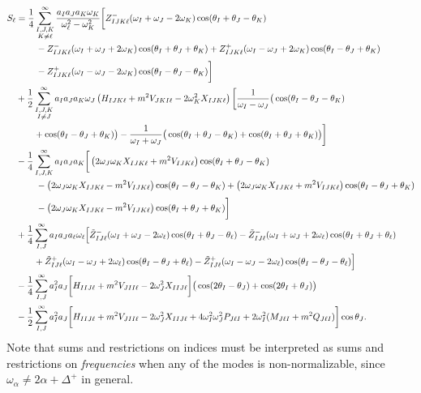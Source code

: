\documentclass[../PhD.tex]{subfiles}
\newcommand{\thl}{\theta_\ell}
\begin{document}
\begin{align}
\label{general source}
S_\ell &=\frac{1}{4} \sum_{\substack{I,J,K \\ K \neq \ell}}^\infty \frac{a_I a_J a_K \omega_K}{\ol^2 - \omega_K^2} \bigg[ Z^-_{IJK\ell} (\omega_I + \omega_J - 2\omega_K) \cos (\theta_I + \theta_J - \theta_K) \nonumber \\
%
&\qquad \frac{}{} - Z^-_{IJK\ell} (\omega_I + \omega_J + 2\omega_K) \cos (\theta_I + \theta_J + \theta_K) + Z^+_{IJK\ell} (\omega_I - \omega_J + 2\omega_K)  \cos(\theta_I - \theta_J + \theta_K) \nonumber \\
%
& \qquad \frac{}{} - Z^+_{IJK\ell} (\omega_I - \omega_J - 2\omega_K) \cos (\theta_I - \theta_J - \theta_K) \bigg] \nonumber \\
%
& + \frac{1}{2}\sum_{\substack{I,J,K \\ I \neq J}}^\infty a_I a_J a_K \omega_J \left( H_{IJK\ell} + m^2 V_{JKI\ell} - 2\omega_K^2 X_{IJK\ell} \right) \bigg[ \frac{1}{\omega_I - \omega_J} \big( \cos (\theta_I - \theta_J - \theta_K)  \nonumber \\
%
& \qquad + \cos(\theta_I - \theta_J + \theta_K) \big) - \frac{1}{\omega_I + \omega_J} \big( \cos (\theta_I + \theta_J - \theta_K)  + \cos ( \theta_I + \theta_J + \theta_K) \big) \bigg] \nonumber \\
%
& - \frac{1}{4} \sum_{I,J,K}^\infty a_I a_J a_K \bigg[ \left( 2\omega_J \omega_K X_{IJK\ell} + m^2 V_{IJK\ell} \right)\cos(\theta_I + \theta_J - \theta_K) \nonumber \\
%
& \qquad \frac{}{} -  \left( 2\omega_J\omega_K X_{IJK\ell} - m^2 V_{IJK\ell} \right) \cos(\theta_I - \theta_J - \theta_K) + \left(2\omega_J \omega_K X_{IJK\ell} + m^2 V_{IJK\ell} \right) \cos (\theta_I - \theta_J + \theta_K) \nonumber \\
%
& \qquad \frac{}{} - \left( 2\omega_J\omega_K X_{IJK\ell} - m^2 V_{IJK\ell} \right) \cos(\theta_I + \theta_J + \theta_K) \bigg] \nonumber \\
%
& + \frac{1}{4} \sum_{I,J}^\infty a_I a_J a_\ell \ol \Big[ \tilde Z^-_{IJ\ell} (\omega_I + \omega_J - 2\ol) \cos (\theta_I + \theta_J - \thl) - \tilde Z^-_{IJ\ell} (\omega_I + \omega_J + 2\ol) \cos(\theta_I + \theta_J +  \thl) \nonumber \\
%
& \qquad + \tilde Z^+_{IJ\ell} (\omega_I - \omega_J + 2\ol) \cos(\theta_I - \theta_J + \thl)  - \tilde Z^+_{IJ\ell} (\omega_I - \omega_J - 2\ol) \cos( \theta_I - \theta_J - \thl)  \Big] \nonumber \\
%
& - \frac{1}{4} \sum_{I,J}^\infty a_I^2 a_J \bigg[ H_{IIJ\ell} + m^2 V_{JII\ell} - 2\omega_J^2 X_{IIJ\ell} \bigg] \big( \cos (2\theta_I - \theta_J) + \cos (2\theta_I + \theta_J) \big) \nonumber \\
%
& - \frac{1}{2} \sum_{I,J}^\infty a_I^2 a_J \bigg[ H_{IIJ\ell} + m^2 V_{JII\ell} - 2\omega_J^2 X_{IIJ\ell} + 4\omega_I^2 \omega_J^2 P_{J\ell I} + 2\omega_I^2 (M_{J\ell I} + m^2 Q_{J\ell I}) \bigg] \cos \theta_J .
\end{align} 
Note that sums and restrictions on indices must be interpreted as sums and restrictions on \emph{frequencies} when any of the modes is non-normalizable, since $\omega_\alpha \neq 2 \alpha + \Delta^+$ in general.
\end{document}

